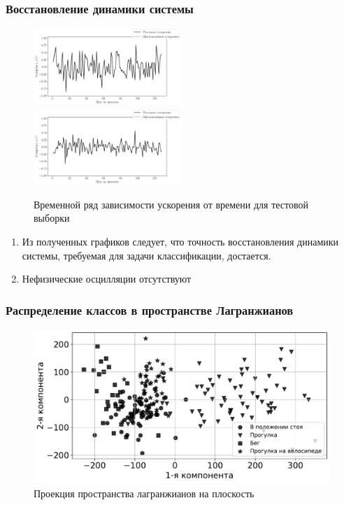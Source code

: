 \documentclass{beamer}
\begin{document}
\begin{frame}
\frametitle{Восстановление динамики системы}
\begin{figure}[H]
     \centering
     \includegraphics[width = 0.5\textwidth]{experiment4_1000.pickle_results_a.pdf}%
     \includegraphics[width = 0.5\textwidth]{experiment4_1000.pickle_results_b.pdf}
     \caption{Временной ряд зависимости ускорения от времени для тестовой выборки}
     \label{fig: trajectory}
\end{figure}
\begin{enumerate}
    \item Из полученных графиков следует, что точность восстановления динамики системы, требуемая для задачи классификации, достается.
    \item Нефизические осцилляции отсутствуют
\end{enumerate}
\end{frame}

  

\begin{frame}
\frametitle{Распределение классов в пространстве Лагранжианов}
\begin{figure}[H]
 \centering
 \includegraphics[scale = 0.45]{Data.pdf}
 \caption{Проекция пространства лагранжианов на плоскость}
 \label{fig: 2D}
\end{figure}

\end{frame}
\end{document}
